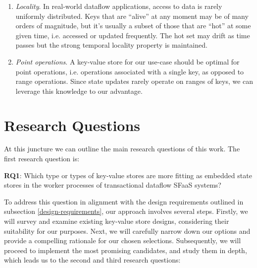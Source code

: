 \begin{enumerate}
    \item \textit{Locality}.
    In real-world dataflow applications, access to data is rarely uniformly distributed.
    Keys that are ``alive'' at any moment may be of many orders of magnitude, but it's usually a subset of those that are ``hot'' at some given time, i.e. accessed or updated frequently.
    The hot set may drift as time passes but the strong temporal locality property is maintained.

    \item \textit{Point operations}.
    A key-value store for our use-case should be optimal for point operations, i.e. operations associated with a single key, as opposed to range operations.
    Since state updates rarely operate on ranges of keys, we can leverage this knowledge to our advantage.

\end{enumerate}

\section{Research Questions}
\label{section-reseach-questions}

At this juncture we can outline the main research questions of this work. The first research question is:\\

\begin{tcolorbox}
    \textbf{RQ1}: Which type or types of key-value stores are more fitting as embedded state stores in the worker processes of transactional dataflow SFaaS systems?
\end{tcolorbox}

\vspace{8px}
To address this question in alignment with the design requirements outlined in subsection \ref{design-requirements}, our approach involves several steps.
Firstly, we will survey and examine existing key-value store designs, considering their suitability for our purposes.
Next, we will carefully narrow down our options and provide a compelling rationale for our chosen selections.
Subsequently, we will proceed to implement the most promising candidates, and study them in depth, which leads us to the second and third research questions:\\

